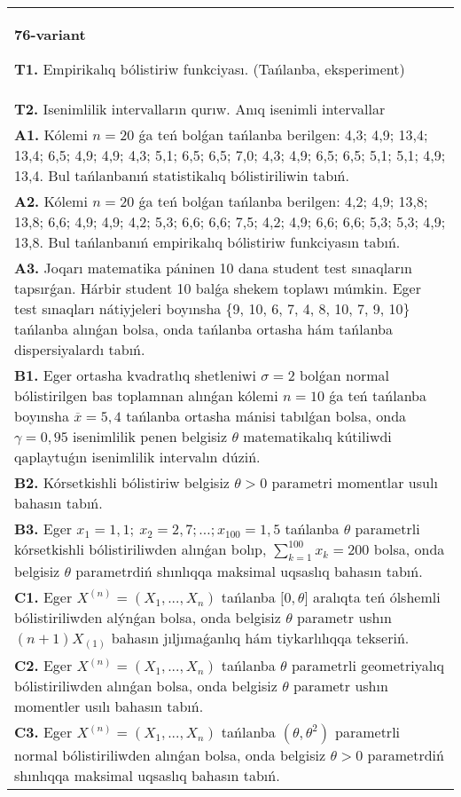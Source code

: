 \documentclass{article}
\begin{document}
\begin{tabular}{m{17cm}}
\textbf{76-variant}
\newline

\textbf{T1.} 
Empirikalıq bólistiriw funkciyası. (Tańlanba, eksperiment)
 \\
\textbf{T2.} 
Isenimlilik intervalların qurıw. Anıq isenimli intervallar
 \\
\textbf{A1.} 
Kólemi \(n = 20\) ǵa teń bolǵan tańlanba berilgen: 4,3; 4,9; 13,4; 13,4; 6,5; 4,9; 4,9; 4,3; 5,1; 6,5; 6,5; 7,0; 4,3; 4,9; 6,5; 6,5; 5,1; 5,1; 4,9; 13,4. Bul tańlanbanıń statistikalıq bólistiriliwin tabıń.
 \\
\textbf{A2.} 
Kólemi \(n = 20\) ǵa teń bolǵan tańlanba berilgen: 4,2; 4,9; 13,8; 13,8; 6,6; 4,9; 4,9; 4,2; 5,3; 6,6; 6,6; 7,5; 4,2; 4,9; 6,6; 6,6; 5,3; 5,3; 4,9; 13,8. Bul tańlanbanıń empirikalıq bólistiriw funkciyasın tabıń.
 \\
\textbf{A3.} 
Joqarı matematika páninen 10 dana student test sınaqların tapsırǵan. Hárbir student 10 balǵa shekem toplawı múmkin. Eger test sınaqları nátiyjeleri boyınsha \{9, 10, 6, 7, 4, 8, 10, 7, 9, 10\} tańlanba alınǵan bolsa, onda tańlanba ortasha hám tańlanba dispersiyalardı tabıń.
 \\
\textbf{B1.} 
Eger ortasha kvadratlıq shetleniwi \(\sigma = 2\) bolǵan normal bólistirilgen bas toplamnan alınǵan kólemi \(n = 10\) ǵa teń tańlanba boyınsha \(\overline{x} = 5,4\) tańlanba ortasha mánisi tabılǵan bolsa, onda \(\gamma = 0,95\) isenimlilik penen belgisiz \(\theta\) matematikalıq kútiliwdi qaplaytuǵın isenimlilik intervalın dúziń.
 \\
\textbf{B2.} 
Kórsetkishli bólistiriw belgisiz \(\theta > 0\) parametri momentlar usulı bahasın tabıń.
 \\
\textbf{B3.} 
Eger \(x_{1} = 1,1;\ x_{2} = 2,7;\ldots;x_{100} = 1,5\) tańlanba \(\theta\) parametrli kórsetkishli bólistiriliwden alınǵan bolıp, \(\sum_{k = 1}^{100}x_{k} = 200\) bolsa, onda belgisiz \(\theta\) parametrdiń shınlıqqa maksimal uqsaslıq bahasın tabıń.
 \\
\textbf{C1.} 
Eger \(X^{(n)} = \left( X_{1},...,X_{n} \right)\) tańlanba \(\lbrack 0,\theta\rbrack\) aralıqta teń ólshemli bólistiriliwden alýnǵan bolsa, onda belgisiz \(\theta\) parametr ushın \((n + 1)X_{(1)}\) bahasın jıljımaǵanlıq hám tiykarlılıqqa tekseriń.
 \\
\textbf{C2.} 
Eger \(X^{(n)} = \left( X_{1},...,X_{n} \right)\) tańlanba \(\theta\) parametrli geometriyalıq bólistiriliwden alınǵan bolsa, onda belgisiz \(\theta\) parametr ushın momentler usılı bahasın tabıń.
 \\
\textbf{C3.} 
Eger \(X^{(n)} = \left( X_{1},...,X_{n} \right)\) tańlanba \(\left( \theta,\theta^{2} \right)\) parametrli normal bólistiriliwden alınǵan bolsa, onda belgisiz \(\theta > 0\) parametrdiń shınlıqqa maksimal uqsaslıq bahasın tabıń.
 \\

\end{tabular}
\vspace{1cm}
\end{document}

